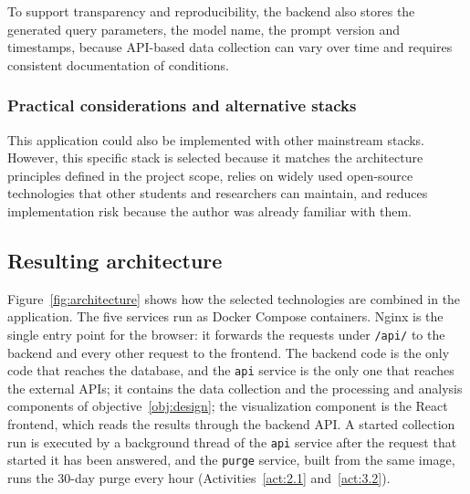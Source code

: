 To support transparency and reproducibility, the backend also stores the generated query parameters, the model name, the prompt version and timestamps, because API-based data collection can vary over time and requires consistent documentation of conditions.

\subsubsection{Practical considerations and alternative stacks}

This application could also be implemented with other mainstream stacks. However, this specific stack is selected because it matches the architecture principles defined in the project scope, relies on widely used open-source technologies that other students and researchers can maintain, and reduces implementation risk because the author was already familiar with them.

\subsection{Resulting architecture}

Figure~\ref{fig:architecture} shows how the selected technologies are combined in the application. The five services run as Docker Compose containers. Nginx is the single entry point for the browser: it forwards the requests under \texttt{/api/} to the backend and every other request to the frontend. The backend code is the only code that reaches the database, and the \texttt{api} service is the only one that reaches the external APIs; it contains the data collection and the processing and analysis components of objective~\ref{obj:design}; the visualization component is the React frontend, which reads the results through the backend API. A started collection run is executed by a background thread of the \texttt{api} service after the request that started it has been answered, and the \texttt{purge} service, built from the same image, runs the 30-day purge every hour (Activities~\ref{act:2.1} and~\ref{act:3.2}).


